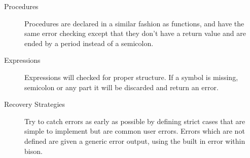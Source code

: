 \documentclass{article}
\begin{document}
\begin{description}
\item[Procedures]
	Procedures are declared in a similar fashion as functions, and have the same
	error checking except that they don't have a return value and are ended by 
	a period instead of a semicolon. 

\item[Expressions]
	Expressions will checked for proper structure. If a symbol is missing,
	semicolon or any part it will be discarded and return an error. 
	
\item[Recovery Strategies]
	Try to catch errors as early as possible by defining strict cases that are
	simple to implement but are common user errors. Errors which are not defined
	are given a generic error output, using the built in error within bison.

\end{description}
\end{document}
